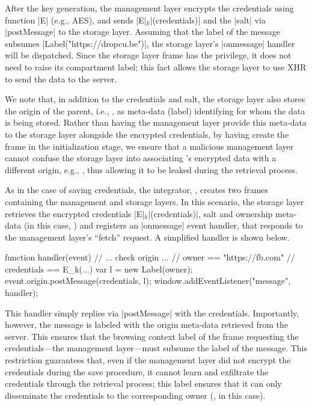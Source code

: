 % 
After the key generation, the management layer encrypts the
credentials using function \js|E| (e.g., AES), and sends
\js|E|$_k$\js|(credentials)| and the \js|salt| via \js|postMessage| to
the storage layer.
%
Assuming that the label of the message subsumes
\js|Label("https://dropcu.be")|, the storage layer's \js|onmessage|
handler will be dispatched. 
%
Since the storage layer frame has the  privilege, it
does not need to raise its compartment label; this fact allows the
storage layer to use XHR to send the data to the 
server.
 
We note that, in addition to the credentials and salt, the storage
layer also stores the origin of the parent, i.e., , as
meta-data (label) identifying for whom the data is being stored.
%
Rather than having the management layer provide this meta-data to the
storage layer alongside the encrypted credentials, by having
 create the frame in the initialization stage, we ensure
that a malicious management layer cannot confuse the storage layer
into associating 's encrypted data with a different
origin, e.g., , thus allowing it to be leaked during
the retrieval process.

%
As in the case of saving credentials, the integrator, ,
creates two frames containing the management and storage layers.
%
In this scenario, the storage layer retrieves the encrypted credentials
\js|E|$_k$\js|(credentials)|, salt and ownership meta-data (in this
case, ) and registers an \js|onmessage| event handler,
that responds to the management layer's ``fetch'' request.
A simplified handler is shown below.
\begin{jscode}
function handler(event) {
  // ... check origin ...
  // owner == "https://fb.com"
  // credentials == E_k(...)
  var l = new Label(owner);
  event.origin.postMessage(credentials, l);
} 
window.addEventListener("message", handler);
\end{jscode}
This handler simply replies via \js|postMessage| with the credentials.
%
Importantly, however, the message is labeled with the origin meta-data
retrieved from the server.
%
This ensures that the browsing context label of the frame requesting
the credentials---the management layer---must subsume the label of the
message. 
%
This restriction guarantees that, even if the management layer did not encrypt the
credentials during the save procedure, it cannot learn and
exfiltrate the credentials through the retrieval process; this
label ensures that it can only disseminate the credentials to the
corresponding owner (, in this case).
%

